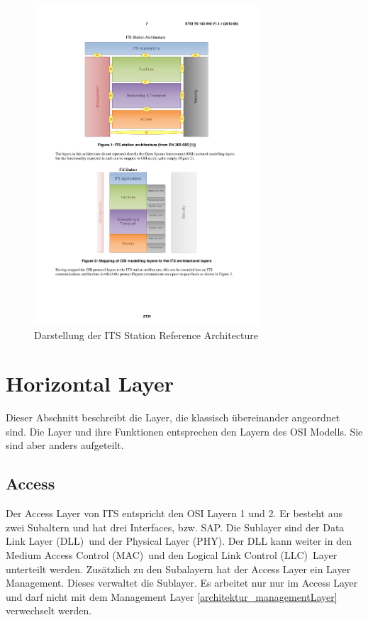 \begin{figure}
	\includegraphics[width=0.75\textwidth]{content/images/02_architektur/stationReferenceArchitecture.pdf}
	\caption{Darstellung der ITS Station Reference Architecture \cite{ts102940}}
	\label{fig:funktionsweise_referenceArchitecture}
\end{figure}

\section{Horizontal Layer}
Dieser Abschnitt beschreibt die Layer, die klassisch übereinander angeordnet sind. Die Layer und ihre Funktionen entsprechen den Layern des \ac{OSI} Modells. Sie sind aber anders aufgeteilt.

\subsection{Access}
Der Access Layer von ITS entspricht den \ac{OSI} Layern 1 und 2. Er besteht aus zwei Subaltern und hat drei Interfaces, bzw. \ac{SAP}. Die Sublayer sind der \glqq Data Link Layer (DLL)\grqq~und der \glqq Physical Layer (PHY)\grqq. Der DLL kann weiter in den \glqq Medium Access Control (MAC)\grqq~und den \glqq Logical Link Control (LLC)\grqq~Layer unterteilt werden. Zusätzlich zu den Subalayern hat der Access Layer ein Layer Management. Dieses verwaltet die Sublayer. Es arbeitet nur nur im Access Layer und darf nicht mit dem  Management Layer \ref{architektur_managementLayer} verwechselt werden.

